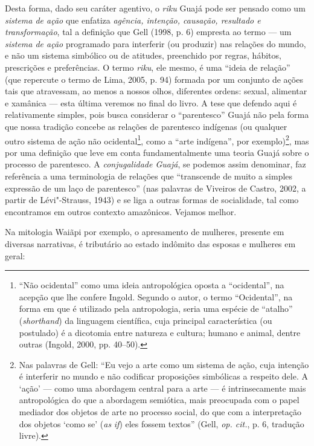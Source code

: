 Desta forma, dado seu caráter agentivo, o \emph{riku} Guajá pode ser
pensado como um \emph{sistema de ação} que enfatiza \emph{agência,
intenção, causação, resultado e transformação}, tal a definição que Gell
(1998, p. 6) empresta ao termo --- um \emph{sistema de ação} programado
para interferir (ou produzir) nas relações do mundo, e não um sistema
simbólico ou de atitudes, preenchido por regras, hábitos, prescrições e
preferências. O termo \emph{riku}, ele mesmo, é uma ``ideia de relação''
(que repercute o termo de Lima, 2005, p. 94) formada por um conjunto de
ações tais que atravessam, ao menos a nossos olhos, diferentes ordens:
sexual, alimentar e xamânica --- esta última veremos no final do livro. A
tese que defendo aqui é relativamente simples, pois busca considerar o
``parentesco'' Guajá não pela forma que nossa tradição concebe as relações
de parentesco indígenas (ou qualquer outro sistema de ação não
ocidental\footnote{``Não ocidental'' como uma ideia antropológica oposta a
  ``ocidental'', na acepção que lhe confere Ingold. Segundo o autor, o
  termo ``Ocidental'', na forma em que é utilizado pela antropologia,
  seria uma espécie de ``atalho'' (\emph{shorthand}) da linguagem
  científica, cuja principal característica (ou postulado) é a dicotomia
  entre natureza e cultura; humano e animal, dentre outras (Ingold,
  2000, pp. 40--50).}, como a ``arte indígena'', por exemplo)\footnote{Nas
  palavras de Gell: ``Eu vejo a arte como um sistema de ação, cuja
      intenção é interferir no mundo e não codificar proposições simbólicas
      a respeito dele. A `ação' --- como uma abordagem central para a arte --- é
      intrinsecamente mais antropológica do que a abordagem semiótica, mais
      preocupada com o papel mediador dos objetos de arte no processo
      social, do que com a interpretação dos objetos `como se' (\emph{as}
      \emph{if}) eles fossem textos'' (Gell, \emph{op. cit.}, p. 6, tradução livre).},
mas por uma definição que leve em conta fundamentalmente uma teoria
Guajá sobre o processo de parentesco. A \emph{conjugalidade Guajá}, se
podemos assim denominar, faz referência a uma terminologia de relações
que ``transcende de muito a simples expressão de um laço de parentesco''
(nas palavras de Viveiros de Castro, 2002, a partir de Lévi"-Strauss,
1943) e se liga a outras formas de socialidade, tal como encontramos em
outros contexto amazônicos. Vejamos melhor.

Na mitologia Waiãpi por exemplo, o apresamento de mulheres, presente em
diversas narrativas, é tributário ao estado indômito das esposas e
mulheres em geral:

